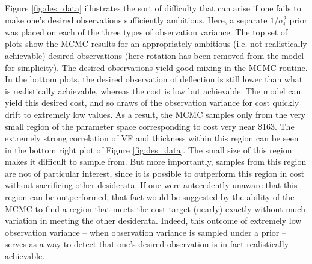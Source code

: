 \documentclass{article}
\begin{document}
Figure \ref{fig:des_data} illustrates the sort of difficulty that can arise if one fails to make one's desired observations sufficiently ambitious. Here, a separate $1/\sigma^2_i$ prior was placed on each of the three types of observation variance. The top set of plots show the MCMC results for an appropriately ambitious (i.e. not realistically achievable) desired observations (here rotation has been removed from the model for simplicity). The desired observations yield good mixing in the MCMC routine. In the bottom plots, the desired observation of deflection is still lower than what is realistically achievable, whereas the cost is low but achievable. The model can yield this desired cost, and so draws of the observation variance for cost quickly drift to extremely low values. As a result, the MCMC samples only from the very small region of the parameter space corresponding to cost very near \$163. The extremely strong correlation of VF and thickness within this region can be seen in the bottom right plot of Figure \ref{fig:des_data}. The small size of this region makes it difficult to sample from. But more importantly, samples from this region are not of particular interest, since it is possible to outperform this region in cost without sacrificing other desiderata. If one were antecedently unaware that this region can be outperformed, that fact would be suggested by the ability of the MCMC to find a region that meets the cost target (nearly) exactly without much variation in meeting the other desiderata. Indeed, this outcome of extremely low observation variance -- when observation variance is sampled under a prior -- serves as a way to detect that one's desired observation is in fact realistically achievable.
\end{document}
